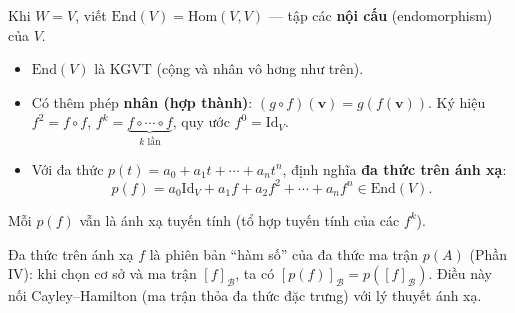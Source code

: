 \documentclass[12pt,a4paper]{article}
\begin{document}
\begin{dinhnghia}[title={Không gian $\mathrm{End}(V)$ và đa thức trên ánh xạ}]
  Khi $W = V$, viết $\mathrm{End}(V) = \mathrm{Hom}(V,V)$ --- tập các \textbf{nội cấu} (endomorphism) của $V$.
  \begin{itemize}
    \item $\mathrm{End}(V)$ là KGVT (cộng và nhân vô hơng như trên).
    \item Có thêm phép \textbf{nhân (hợp thành)}: $(g \circ f)(\mathbf{v}) = g(f(\mathbf{v}))$. Ký hiệu $f^2 = f \circ f$, $f^k = \underbrace{f \circ \cdots \circ f}_{k \text{ lần}}$, quy ước $f^0 = \mathrm{Id}_V$.
    \item Với đa thức $p(t) = a_0 + a_1 t + \cdots + a_n t^n$, định nghĩa \textbf{đa thức trên ánh xạ}:
    \[
      p(f) = a_0 \mathrm{Id}_V + a_1 f + a_2 f^2 + \cdots + a_n f^n \in \mathrm{End}(V).
    \]
  \end{itemize}
  Mỗi $p(f)$ vẫn là ánh xạ tuyến tính (tổ hợp tuyến tính của các $f^k$).
\end{dinhnghia}

\begin{ynghia}
Đa thức trên ánh xạ $f$ là phiên bản ``hàm số'' của đa thức ma trận $p(A)$ (Phần IV): khi chọn cơ sở và ma trận $[f]_{\mathcal{B}}$, ta có $[p(f)]_{\mathcal{B}} = p([f]_{\mathcal{B}})$. Điều này nối Cayley--Hamilton (ma trận thỏa đa thức đặc trưng) với lý thuyết ánh xạ.
\end{ynghia}
\end{document}
